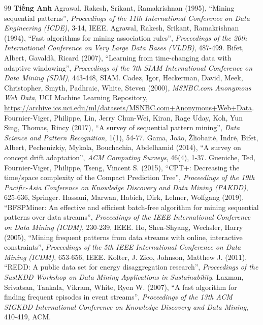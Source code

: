 \begin{thebibliography}{99}
\vspace{0.5cm}
\noindent\textbf{Tiếng Anh}
 Agrawal, Rakesh, Srikant, Ramakrishnan (1995), ``Mining sequential patterns'', \textit{Proceedings of the 11th International Conference on Data Engineering (ICDE)}, 3-14, IEEE.
 Agrawal, Rakesh, Srikant, Ramakrishnan (1994), ``Fast algorithms for mining association rules'', \textit{Proceedings of the 20th International Conference on Very Large Data Bases (VLDB)}, 487-499.
 Bifet, Albert, Gavald\`{a}, Ricard (2007), ``Learning from time-changing data with adaptive windowing'', \textit{Proceedings of the 7th SIAM International Conference on Data Mining (SDM)}, 443-448, SIAM.
 Cadez, Igor, Heckerman, David, Meek, Christopher, Smyth, Padhraic, White, Steven (2000), \textit{MSNBC.com Anonymous Web Data}, UCI Machine Learning Repository, \url{https://archive.ics.uci.edu/ml/datasets/MSNBC.com+Anonymous+Web+Data}.
 Fournier-Viger, Philippe, Lin, Jerry Chun-Wei, Kiran, Rage Uday, Koh, Yun Sing, Thomas, Rincy (2017), ``A survey of sequential pattern mining'', \textit{Data Science and Pattern Recognition}, 1(1), 54-77.
 Gama, Jo{\~a}o, \v{Z}liobait{\.e}, Indr{\.e}, Bifet, Albert, Pechenizkiy, Mykola, Bouchachia, Abdelhamid (2014), ``A survey on concept drift adaptation'', \textit{ACM Computing Surveys}, 46(4), 1-37.
 Gueniche, Ted, Fournier-Viger, Philippe, Tseng, Vincent S. (2015), ``CPT+: Decreasing the time/space complexity of the Compact Prediction Tree'', \textit{Proceedings of the 19th Pacific-Asia Conference on Knowledge Discovery and Data Mining (PAKDD)}, 625-636, Springer.
 Hassani, Marwan, Habich, Dirk, Lehner, Wolfgang (2019), ``BFSPMiner: An effective and efficient batch-free algorithm for mining sequential patterns over data streams'', \textit{Proceedings of the IEEE International Conference on Data Mining (ICDM)}, 230-239, IEEE.
 Ho, Shen-Shyang, Wechsler, Harry (2005), ``Mining frequent patterns from data streams with online, interactive constraints'', \textit{Proceedings of the 5th IEEE International Conference on Data Mining (ICDM)}, 653-656, IEEE.
 Kolter, J. Zico, Johnson, Matthew J. (2011), ``REDD: A public data set for energy disaggregation research'', \textit{Proceedings of the SustKDD Workshop on Data Mining Applications in Sustainability}.
 Laxman, Srivatsan, Tankala, Vikram, White, Ryen W. (2007), ``A fast algorithm for finding frequent episodes in event streams'', \textit{Proceedings of the 13th ACM SIGKDD International Conference on Knowledge Discovery and Data Mining}, 410-419, ACM.

\end{thebibliography}
